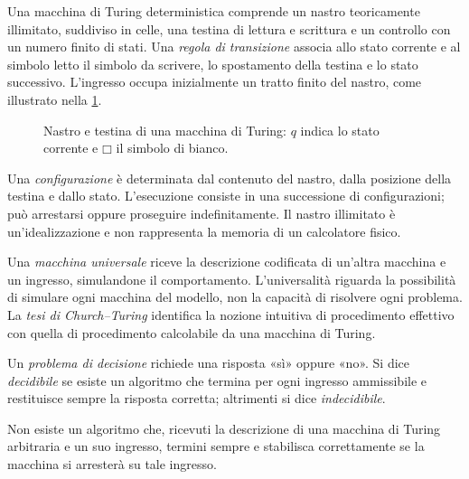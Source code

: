 Una macchina di Turing deterministica comprende un nastro teoricamente
illimitato, suddiviso in celle, una testina di lettura e scrittura e
un controllo con un numero finito di stati. Una \emph{regola di
transizione} associa allo stato corrente e al simbolo letto il simbolo
da scrivere, lo spostamento della testina e lo stato successivo.
L'ingresso occupa inizialmente un tratto finito del nastro,
come illustrato nella \cref{fig:fi-nastro-turing}.

\begin{figure}[htbp]
  \centering
  
  \caption{Nastro e testina di una macchina di Turing: \(q\) indica
  lo stato corrente e \(\mdlgwhtsquare\) il simbolo di bianco.}
  \label{fig:fi-nastro-turing}
\end{figure}

Una \emph{configurazione} è determinata dal contenuto del nastro,
dalla posizione della testina e dallo stato. L'esecuzione consiste
in una successione di configurazioni; può arrestarsi oppure proseguire
indefinitamente. Il nastro illimitato è un'idealizzazione e non
rappresenta la memoria di un calcolatore fisico.

Una \emph{macchina universale} riceve la descrizione codificata di
un'altra macchina e un ingresso, simulandone il comportamento.
L'universalità riguarda la possibilità di simulare ogni macchina
del modello, non la capacità di risolvere ogni problema.
La \emph{tesi di Church--Turing} identifica la nozione intuitiva di
procedimento effettivo con quella di procedimento calcolabile da una
macchina di Turing.

\begin{definition}
\label{def:fi-decidibilita}
Un \emph{problema di decisione} richiede una risposta «sì» oppure «no».
Si dice \emph{decidibile} se esiste un algoritmo che termina per ogni
ingresso ammissibile e restituisce sempre la risposta corretta;
altrimenti si dice \emph{indecidibile}.
\end{definition}

\begin{proposition}
\label{prop:fi-problema-arresto}
Non esiste un algoritmo che, ricevuti la descrizione di una macchina
di Turing arbitraria e un suo ingresso, termini sempre e stabilisca
correttamente se la macchina si arresterà su tale ingresso.
\end{proposition}

